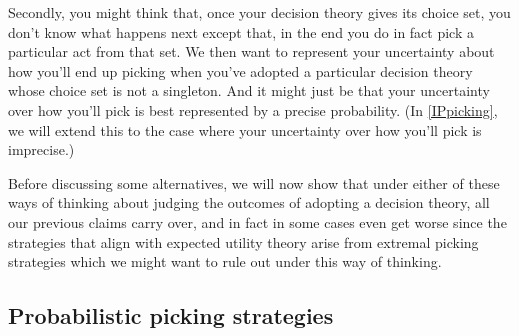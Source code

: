 \documentclass[a4paper]{article}
\newcommand\Exp{\mathsf{Exp}}
\newcommand\U{\mathfrak{U}} %
\renewcommand{\color}[1]{}
\newenvironment{CCM rewritten}
{\begingroup\color{blue}} %
{\endgroup}              %
\begin{document}
Secondly, you might think that, once your decision theory gives its choice set, you don't know what happens next except that, in the end you do in fact pick a particular act from that set. We then want to represent your uncertainty about how you'll end up picking when you've adopted a particular decision theory whose choice set is not a singleton. And it might just be that your uncertainty over how you'll pick is best represented by a precise probability. {\color{red} (In \cref{IPpicking}, we will extend this to the case where your uncertainty over how you'll pick is imprecise.)}



Before discussing some alternatives, we will now show that under either of these ways of thinking about judging the outcomes of adopting a decision theory, all our previous claims carry over, and in fact in some cases even get worse since the strategies that align with expected utility theory arise from extremal picking strategies which we might want to rule out under this way of thinking. 






\subsection{Probabilistic picking strategies}
\end{document}
